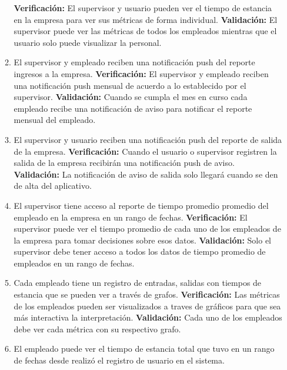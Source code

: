 \documentclass[
11pt, %
]{charter}
\begin{document}
\begin{enumerate}
\begin{enumerate}
			\textbf{Verificación:}
			El supervisor y usuario pueden ver el tiempo de estancia en la empresa para ver sus métricas de forma individual.
			\newline
		    \textbf{Validación:}
		    El supervisor puede ver las métricas de todos los empleados mientras que el usuario solo puede visualizar la personal.
			\item El supervisor y empleado reciben una notificación push del reporte ingresos a la empresa.
			\newline
			\textbf{Verificación:}
			El supervisor y empleado reciben una notificación push mensual de acuerdo a lo establecido por el supervisor.
			\newline
		    \textbf{Validación:}
		    Cuando se cumpla el mes en curso cada empleado recibe una notificación de aviso para notificar el reporte mensual del empleado.
			\item El supervisor y usuario reciben una notificación push del reporte de salida de la empresa.
			\newline
			\textbf{Verificación:}
			\newline
			Cuando el usuario o supervisor registren la salida de la empresa recibirán una notificación push de aviso.
			\newline
		    \textbf{Validación:}
		    La notificación de aviso de salida solo llegará cuando se den de alta del aplicativo.
			\item El supervisor tiene acceso al reporte de tiempo promedio promedio del empleado en la empresa en un rango de fechas. 
			\newline
			\textbf{Verificación:}
			El supervisor puede ver el tiempo promedio de cada uno de los empleados de la empresa para tomar decisiones sobre esos datos.
			\newline
		    \textbf{Validación:}
		    Solo el supervisor debe tener acceso a todos los datos de tiempo promedio de empleados en un rango de fechas.
			\item Cada empleado tiene un registro de entradas, salidas con tiempos de estancia que se pueden ver a través de grafos.
			\newline
			\textbf{Verificación:}
			Las métricas de los empleados pueden ser visualizados a traves de gráficos para que sea más interactiva la interpretación.
			\newline
		    \textbf{Validación:}
		    Cada uno de los empleados debe ver cada métrica con su respectivo grafo.
			\item El empleado puede ver el tiempo de estancia total  que tuvo en un rango de fechas desde realizó el registro de usuario en el sistema.

\end{enumerate}
\end{enumerate}
\end{document}
